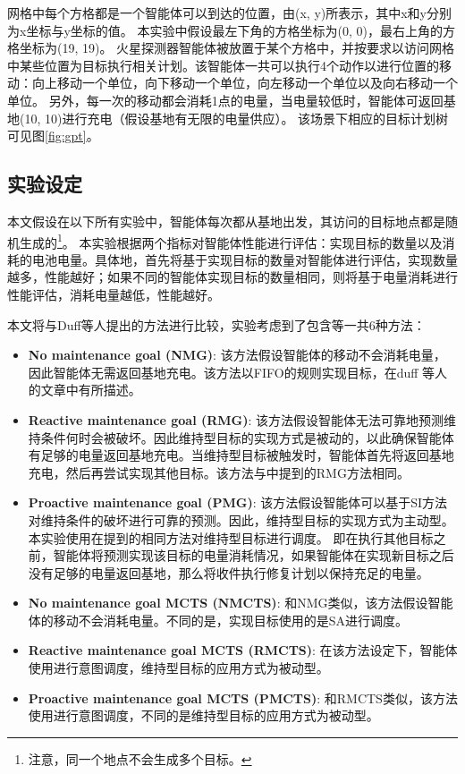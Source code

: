网格中每个方格都是一个智能体可以到达的位置，由(x, y)所表示，其中x和y分别为x坐标与y坐标的值。
%
本实验中假设最左下角的方格坐标为(0, 0)，最右上角的方格坐标为(19, 19)。
% 
火星探测器智能体被放置于某个方格中，并按要求以访问网格中某些位置为目标执行相关计划。该智能体一共可以执行4个动作以进行位置的移动：向上移动一个单位，向下移动一个单位，向左移动一个单位以及向右移动一个单位。
% 
另外，每一次的移动都会消耗1点的电量，当电量较低时，智能体可返回基地(10, 10)进行充电（假设基地有无限的电量供应）。
%
该场景下相应的目标计划树可见图\ref{fig:gpt}。
\subsection{实验设定}
本文假设在以下所有实验中，智能体每次都从基地出发，其访问的目标地点都是随机生成的\footnote{注意，同一个地点不会生成多个目标。}。
本实验根据两个指标对智能体性能进行评估：实现目标的数量以及消耗的电池电量。具体地，首先将基于实现目标的数量对智能体进行评估，实现数量越多，性能越好；如果不同的智能体实现目标的数量相同，则将基于电量消耗进行性能评估，消耗电量越低，性能越好。

本文将\SAM 与Duff等人提出的方法\cite{DBLP:conf/atal/DuffHT06}进行比较，实验考虑到了包含\SAM 等一共6种方法：

\begin{itemize}
\item \textbf{No maintenance goal (NMG)}: 该方法假设智能体的移动不会消耗电量，因此智能体无需返回基地充电。该方法以FIFO的规则实现目标，在duff 等人的文章\cite{DBLP:conf/atal/DuffHT06}中有所描述。
\item \textbf{Reactive maintenance goal (RMG)}: 该方法假设智能体无法可靠地预测维持条件何时会被破坏。因此维持型目标的实现方式是被动的，以此确保智能体有足够的电量返回基地充电。当维持型目标被触发时，智能体首先将返回基地充电，然后再尝试实现其他目标。该方法与\cite{DBLP:conf/atal/DuffHT06}中提到的RMG方法相同。
\item \textbf{Proactive maintenance goal (PMG)}: 该方法假设智能体可以基于SI方法对维持条件的破坏进行可靠的预测。因此，维持型目标的实现方式为主动型。本实验使用在\cite{DBLP:conf/atal/DuffHT06}提到的相同方法对维持型目标进行调度。
即在执行其他目标之前，智能体将预测实现该目标的电量消耗情况，如果智能体在实现新目标之后没有足够的电量返回基地，那么将收件执行修复计划以保持充足的电量。

\item \textbf{No maintenance goal MCTS (NMCTS)}: 和NMG类似，该方法假设智能体的移动不会消耗电量。不同的是，实现目标使用的是SA进行调度。
\item \textbf{Reactive maintenance goal MCTS (RMCTS)}: 在该方法设定下，智能体使用\SAM 进行意图调度，维持型目标的应用方式为被动型。
\item \textbf{Proactive maintenance goal MCTS (PMCTS)}: 和RMCTS类似，该方法使用\SAM 进行意图调度，不同的是维持型目标的应用方式为被动型。
\end{itemize}


